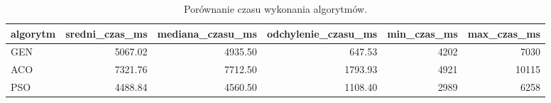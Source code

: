 \begin{table}
\caption{Porównanie czasu wykonania algorytmów.}
\label{tab:czas_wykonania}
\begin{tabular}{lrrrrr}
\toprule
algorytm & sredni_czas_ms & mediana_czasu_ms & odchylenie_czasu_ms & min_czas_ms & max_czas_ms \\
\midrule
GEN & 5067.02 & 4935.50 & 647.53 & 4202 & 7030 \\
ACO & 7321.76 & 7712.50 & 1793.93 & 4921 & 10115 \\
PSO & 4488.84 & 4560.50 & 1108.40 & 2989 & 6258 \\
\bottomrule
\end{tabular}
\end{table}
